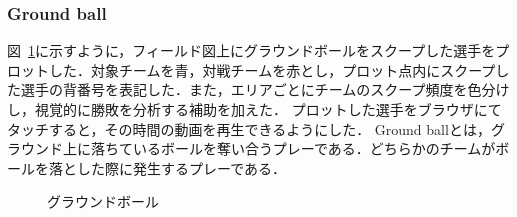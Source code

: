 \documentclass[sotsuron]{kuee}
\begin{document}
			\subsubsection{Ground ball}
				図~\ref{fig:gb}に示すように，フィールド図上にグラウンドボールをスクープした選手をプロットした．対象チームを青，対戦チームを赤とし，プロット点内にスクープした選手の背番号を表記した．また，エリアごとにチームのスクープ頻度を色分けし，視覚的に勝敗を分析する補助を加えた．
				プロットした選手をブラウザにてタッチすると，その時間の動画を再生できるようにした．
				Ground ballとは，グラウンド上に落ちているボールを奪い合うプレーである．どちらかのチームがボールを落とした際に発生するプレーである．
					\begin{figure}
						\begin{center}
						\end{center}
						\caption{グラウンドボール}
				  		\label{fig:gb}
					\end{figure}
\end{document}
